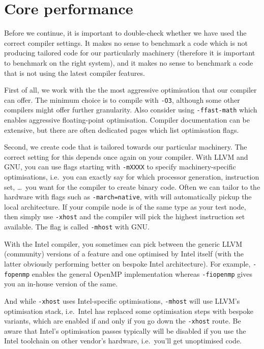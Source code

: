 \section{Core performance}
\label{section:tailoring:core}

Before we continue, it is important to double-check whether we have used the correct
compiler settings. It makes no sense to benchmark a code which is not producing
tailored code for our particularly machinery (therefore it is important to
benchmark on the right system), and it makes no sense to benchmark a code that
is not using the latest compiler features.


First of all, we work with the the most aggressive optimisation that our
compiler can offer. The minimum choice is to compile with \texttt{-O3},
although some other compilers might offer further granularity. Also consider
using \texttt{-ffast-math} which enables aggressive floating-point
optimisation. Compiler documentation can be extensive, but there are often dedicated
pages which list optimisation flags.


Second, we create code that is tailored towards our particular machinery.
The correct setting for this depends once again on your compiler. 
With LLVM and GNU, you can use flags starting with \texttt{-mXXXX} to specify 
machinery-specific optimisations, i.e.~you can exactly say for which processor
generation, instruction set, \ldots~you want for the compiler to create binary code. Often we can tailor to the hardware with flags such as \texttt{-march=native}, with will automatically pickup the local architecture.
If your compile node is of the same type as your test node, then simply
use \texttt{-xhost} and the compiler will pick the highest instruction set
available.
The flag is called \texttt{-mhost} with GNU.

\begin{instructions}{\intelcompiler}
 With the Intel compiler, you sometimes can pick between the generic
 LLVM (community) versions of a feature and one optimised by Intel itself (with
 the latter obviously performing better on bespoke Intel architecture). For
 example, \texttt{-fopenmp} enables the general OpenMP implementation whereas
 \texttt{-fiopenmp} gives you an in-house version of the same. 
 
 And while \texttt{-xhost} uses Intel-specific optimisations, \texttt{-mhost}
 will use LLVM's optimisation stack, i.e.~Intel has replaced some optimisation
 steps with bespoke variants, which are enabled if and only if you go down the
 \texttt{-xhost} route. Be aware that Intel's optimisation passes typically will
 be disabled if you use the Intel toolchain on other vendor's hardware,
 i.e.~you'll get unoptimised code.
\end{instructions}

